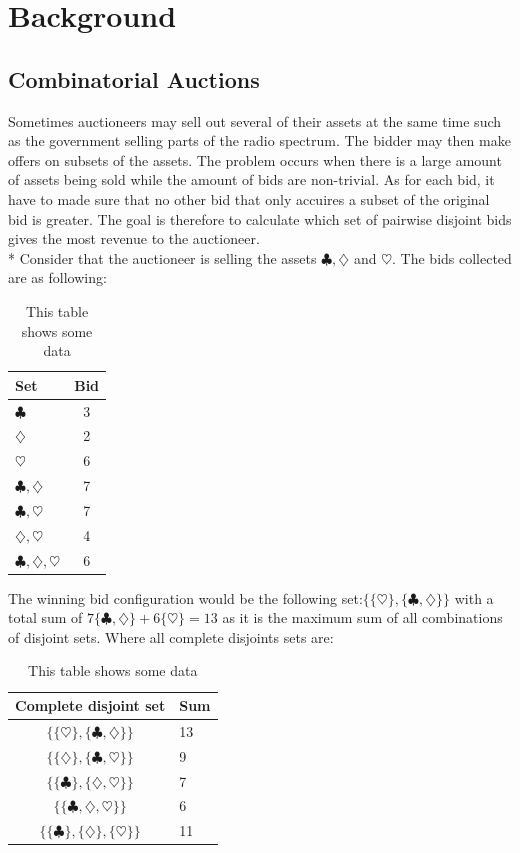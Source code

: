 \documentclass[a4paper, 12pt]{report}
\begin{document}
\section{Background}
\subsection{Combinatorial Auctions}
Sometimes auctioneers may sell out several of their assets at the same time such as the government selling parts of the radio spectrum. The bidder may then make offers on subsets of the assets. The problem occurs when there is a large amount of assets being sold while the amount of bids are non-trivial. As for each bid, 
it have to made sure that no other bid that only accuires a subset of the original bid is greater.
The goal is therefore to calculate which set of pairwise disjoint bids gives the most revenue to the auctioneer.\\*
\newpage
 Consider that the auctioneer is selling the assets $\clubsuit , \diamondsuit$ and $\heartsuit$. The bids collected are as following:

\begin{table}[htb]
\centering
\begin{tabular}{ l | c}
\hline  
Set & Bid \\
\hline
$\clubsuit$ & 3 \\
$\diamondsuit$ & 2 \\
$\heartsuit$ & 6 \\
$\clubsuit, \diamondsuit$ & 7 \\
$\clubsuit, \heartsuit$ & 7 \\
$\diamondsuit, \heartsuit$ & 4 \\
$\clubsuit, \diamondsuit, \heartsuit$ & 6 \\
\end{tabular}
\caption{This table shows some data}
\label{tab:bids}
\end{table}
The winning bid configuration would be the following set:$ \{\{\heartsuit\},\{\clubsuit , \diamondsuit\}\}$ 
with a total sum of $7 \{\clubsuit , \diamondsuit\}+6 \{\heartsuit\} = 13$ as it is the maximum sum of all combinations of disjoint sets. Where all complete disjoints sets are:

\begin{table}[htb]
\centering
\begin{tabular}{c | l }
\hline
Complete disjoint set & Sum\\
\hline
$\{\{\heartsuit \},\{\clubsuit , \diamondsuit \}\} $ & 13 \\
$\{\{\diamondsuit \},\{\clubsuit , \heartsuit \}\} $ & 9 \\
$\{\{\clubsuit \},\{\diamondsuit , \heartsuit \}\} $ & 7 \\

$\{\{\clubsuit,\diamondsuit , \heartsuit \}\} $ & 6 \\
$\{\{\clubsuit \},\{\diamondsuit \}, \{ \heartsuit \}\} $ &  11
\end{tabular}
\caption{This table shows some data}
\label{tab:disjoint}
\end{table}
\end{document}
